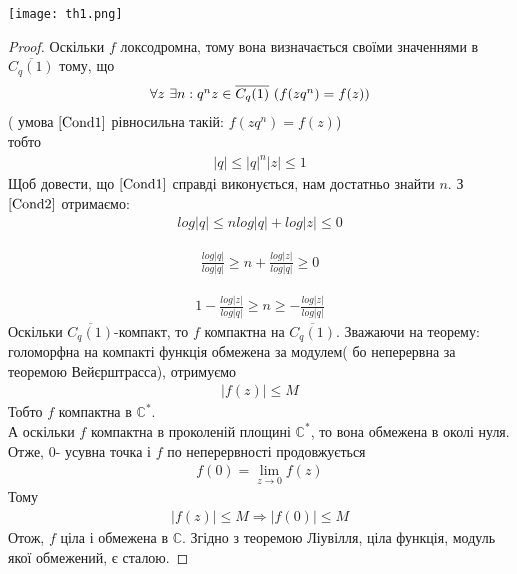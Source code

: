\documentclass[12pt,a4paper]{article}
\begin{document}
\texttt{[image: th1.png]}
\begin{proof}
Оскільки $f$ локсодромна, тому вона визначається своїми значеннями в $\overline{C_{q}(1)}$ тому, що 
\begin{equation}\label{Cond1}
\begin{array}{l}
 \forall z $ $\exists n: q^{n}z \in \overline{C_{q}(1)} $ ($f(zq^{n})=f(z)$)$ 
\end{array}
\end{equation} 
( умова $\eqref{Cond1}$ рівносильна такій: $f(zq^{n})=f(z)$)\\
тобто
\begin{equation}\label{Cond2}
\begin{array}{l}
\vert q \vert \leq \vert q\vert ^{n} \vert z\vert \leq 1                       
\end{array}
\end{equation}
Щоб довести, що $\eqref{Cond1}$ справді виконується, нам достатньо знайти $n$. З $\eqref{Cond2}$ отримаємо:
\[\begin{array}{l}
log\vert q \vert \leq n log\vert q\vert +log \vert z\vert \leq 0                       
\end{array}\]

\[\begin{array}{l}
\frac {log\vert q \vert }{log\vert q\vert} \geq n  + \frac{ log \vert z\vert}{log\vert q\vert} \geq 0                       
\end{array}\]

\[\begin{array}{l}
1- \frac{ log \vert z\vert}{log\vert q\vert} \geq n  \geq -\frac{ log \vert z\vert}{log\vert q\vert} 
\end{array}\]
Оскільки $\overline{C_{q}(1)}$-компакт, то $f$ компактна на $\overline{C_{q}(1)}$. Зважаючи на теорему: голоморфна на компакті функція обмежена за модулем( бо неперервна за теоремою Вейєрштрасса), отримуємо
\[\begin{array}{l}
  \vert f(z) \vert\leq M
\end{array}\]
Тобто $f$ компактна в $\mathbb{C}^{*}$. \\
А оскільки $f$ компактна в проколеній площині $\mathbb{C}^{*}$, то вона обмежена в околі нуля. Отже, $0$- усувна точка і $f$ по неперервності продовжується
\[\begin{array}{l}
  f(0)=\lim_{z\rightarrow 0} f(z)
\end{array}\]
Тому 
\[\begin{array}{l}
  \vert f(z) \vert\leq M \Longrightarrow \vert f(0) \vert\leq M
\end{array}\]
Отож, $f$ ціла і обмежена в $\mathbb{C}$. Згідно з теоремою Ліувілля, ціла функція, модуль якої обмежений, є сталою.
\end{proof}
\[\begin{array}{l}
\end{array} \]
\end{document}
